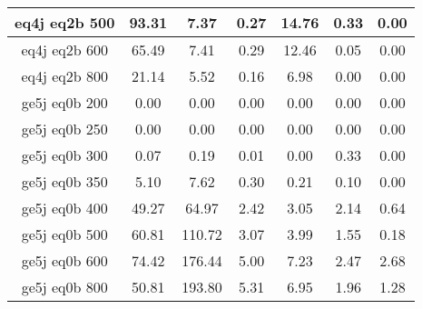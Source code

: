 \begin{longtable}{| c | c | c | c | c | c | c  | }
eq4j eq2b 500 & 93.31 & 7.37 & 0.27 & 14.76 & 0.33 & 0.00\\ \hline 
eq4j eq2b 600 & 65.49 & 7.41 & 0.29 & 12.46 & 0.05 & 0.00\\ \hline 
eq4j eq2b 800 & 21.14 & 5.52 & 0.16 & 6.98 & 0.00 & 0.00\\ \hline 
ge5j eq0b 200 & 0.00 & 0.00 & 0.00 & 0.00 & 0.00 & 0.00\\ \hline 
ge5j eq0b 250 & 0.00 & 0.00 & 0.00 & 0.00 & 0.00 & 0.00\\ \hline 
ge5j eq0b 300 & 0.07 & 0.19 & 0.01 & 0.00 & 0.33 & 0.00\\ \hline 
ge5j eq0b 350 & 5.10 & 7.62 & 0.30 & 0.21 & 0.10 & 0.00\\ \hline 
ge5j eq0b 400 & 49.27 & 64.97 & 2.42 & 3.05 & 2.14 & 0.64\\ \hline 
ge5j eq0b 500 & 60.81 & 110.72 & 3.07 & 3.99 & 1.55 & 0.18\\ \hline 
ge5j eq0b 600 & 74.42 & 176.44 & 5.00 & 7.23 & 2.47 & 2.68\\ \hline 
ge5j eq0b 800 & 50.81 & 193.80 & 5.31 & 6.95 & 1.96 & 1.28\\ \hline 
    \hline 
    \hline 
\end{longtable}

